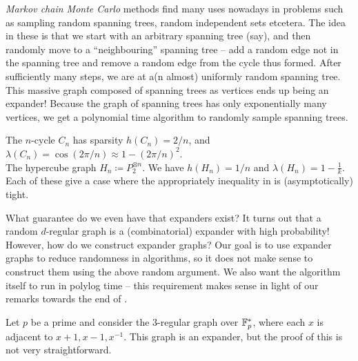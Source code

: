 			\emph{Markov chain Monte Carlo} methods find many uses nowadays in problems such as sampling random spanning trees, random independent sets etcetera. The idea in these is that we start with an arbitrary spanning tree (say), and then randomly move to a ``neighbouring'' spanning tree -- add a random edge not in the spanning tree and remove a random edge from the cycle thus formed. After sufficiently many steps, we are at a(n almost) uniformly random spanning tree. This massive graph composed of spanning trees as vertices ends up being an expander! Because the graph of spanning trees has only exponentially many vertices, we get a polynomial time algorithm to randomly sample spanning trees.

			\begin{fex}
				The $n$-cycle $C_n$ has sparsity $h(C_n) = 2/n$, and $\lambda(C_n) = \cos(2\pi/n) \approx 1 - (2\pi/n)^2$.\\
				The hypercube graph $H_n \coloneqq P_2^{\otimes n}$. We have $h(H_n) = 1/n$ and $\lambda(H_n) = 1 - \frac{1}{k}$.\\
				Each of these give a case where the appropriately inequality in  is (asymptotically) tight.
			\end{fex}

			What guarantee do we even have that expanders exist? It turns out that a random $d$-regular graph is a (combinatorial) expander with high probability!\\
			
			However, how do we construct expander graphs? Our goal is to use expander graphs to reduce randomness in algorithms, so it does not make sense to construct them using the above random argument. We also want the algorithm itself to run in polylog time -- this requirement makes sense in light of our remarks towards the end of \nameref{lec 6}.

			\begin{fex}
				Let $p$ be a prime and consider the $3$-regular graph over $\mathbb{F}_p^*$, where each $x$ is adjacent to $x+1,x-1,x^{-1}$. This graph is an expander, but the proof of this is not very straightforward.
			\end{fex}

